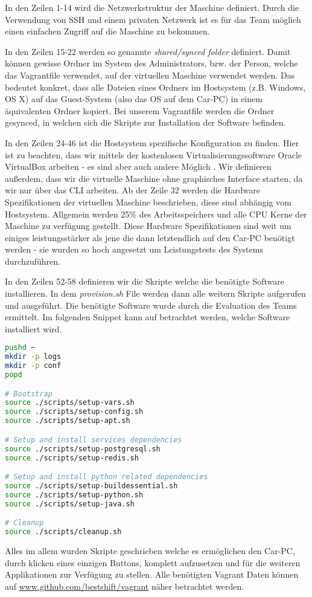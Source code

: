 In den Zeilen 1-14 wird die Netzwerkstruktur der Maschine definiert. Durch die Verwendung von SSH \cite{MELD.CH3-ssh.website} und einem privaten Netzwerk ist es für das Team möglich einen einfachen Zugriff auf die Maschine zu bekommen.

In den Zeilen 15-22 werden so genannte \textit{shared/synced folder} \cite{MELD.CH3-vagrant.syncedFolders} definiert. Damit können gewisse Ordner im System des Administrators, bzw. der Person, welche das Vagrantfile verwendet, auf der virtuellen Maschine verwendet werden. Das bedeutet konkret, dass alle Dateien eines Ordners im Hostsystem (z.B. Windows, OS X) auf das Guest-System (also das OS auf dem Car-PC) in einem äquivalenten Ordner kopiert. Bei unserem Vagrantfile werden die Ordner gesynced, in welchen sich die Skripte zur Installation der Software befinden.

In den Zeilen 24-46 ist die Hostsystem spezifische Konfiguration zu finden. Hier ist zu beachten, dass wir mittels der kostenlosen Virtualisierungssoftware Oracle VirtualBox \cite{MELD.CH3-virtualbox.website} arbeiten - es sind aber auch andere Möglich \cite{MELD.CH3-vagrant.providers}. Wir definieren außerdem, dass wir die virtuelle Maschine ohne graphisches Interface starten, da wir nur über das CLI arbeiten. Ab der Zeile 32 werden die Hardware Spezifikationen der virtuellen Maschine beschrieben, diese sind abhängig vom Hostsystem. Allgemein werden 25\% des Arbeitsspeichers und alle CPU Kerne der Maschine zu verfügung gestellt. Diese Hardware Spezifikationen sind weit um einiges leistungsstärker als jene die dann letztendlich auf den Car-PC benötigt werden - sie wurden so hoch angesetzt um Leistungstests des Systems durchzuführen.

In den Zeilen 52-58 definieren wir die Skripte welche die benötigte Software installieren. In dem \textit{provision.sh} File werden dann alle weitern Skripte aufgerufen und ausgeführt. Die benötigte Software wurde durch die Evaluation des Teams ermittelt. Im folgenden Snippet kann auf betrachtet werden, welche Software installiert wird.

\begin{lstlisting}[language=bash, caption=provision.sh]
pushd ~
mkdir -p logs
mkdir -p conf
popd

# Bootstrap
source ./scripts/setup-vars.sh
source ./scripts/setup-config.sh
source ./scripts/setup-apt.sh

# Setup and install services dependencies
source ./scripts/setup-postgresql.sh
source ./scripts/setup-redis.sh

# Setup and install python related dependencies
source ./scripts/setup-buildessential.sh
source ./scripts/setup-python.sh
source ./scripts/setup-java.sh

# Cleanup
source ./scripts/cleanup.sh
\end{lstlisting}

Alles im allem wurden Skripte geschrieben welche es ermöglichen den Car-PC, durch klicken eines einzigen Buttons, komplett aufzusetzen und für die weiteren Applikationen zur Verfügung zu stellen. Alle benötigten Vagrant Daten können auf \url{www.github.com/bestshift/vagrant} näher betrachtet werden.